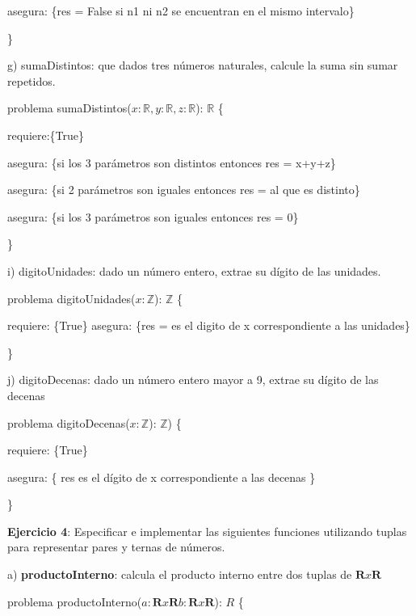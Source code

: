 \documentclass{article}
\begin{document}
    
    asegura: \{res = False si n1 ni n2 se encuentran en el mismo intervalo\}
    
\}\newline



g) sumaDistintos: que dados tres números naturales, calcule la suma sin sumar repetidos.\newline


problema sumaDistintos($x: \mathbb{R}, y: \mathbb{R}, z: \mathbb{R}$): $\mathbb{R}$ \{

    \qquad requiere:\{True\}


    \qquad asegura: \{si los 3 parámetros son distintos entonces res = x+y+z\}


    \qquad asegura: \{si 2 parámetros son iguales entonces res = al que es distinto\}


    \qquad asegura: \{si los 3 parámetros son iguales entonces res = 0\}

\}\newline



i) digitoUnidades: dado un número entero, extrae su dígito de las unidades.\newline

problema digitoUnidades($x: \mathbb{Z}$): $\mathbb{Z}$ \{

    \qquad requiere: \{True\}
    \qquad asegura: \{res = es el digito de x correspondiente a las unidades\}


\}\newline


j) digitoDecenas: dado un número entero mayor a 9, extrae su dígito de las decenas\newline

problema digitoDecenas($x: \mathbb{Z}$): $\mathbb{Z}$) \{ 
    

    requiere: \{True\}


    asegura: \{ res es el dígito de x correspondiente a las decenas \}

\}\newline

\textbf{Ejercicio 4}: Especificar e implementar las siguientes funciones utilizando tuplas para representar pares y ternas de números.\newline

a) \textbf{productoInterno}: calcula el producto interno entre dos tuplas de $\mathbf{R} x \mathbf{R}$

problema productoInterno($a:\mathbf{R}  x  \mathbf{R} b:\mathbf{R}  x  \mathbf{R}$): ${R}$ \{
\end{document}
